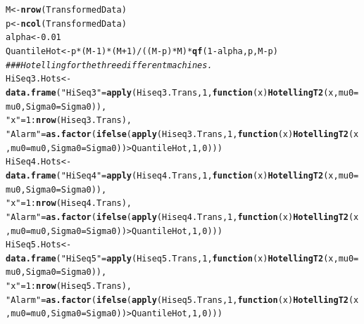 \documentclass[a4paper,11pt,fleqn,twoside,notitlepage]{report}
\makeatletter
\newcommand{\hlnum}[1]{\textcolor[rgb]{0.686,0.059,0.569}{#1}}%
\newcommand{\hlstr}[1]{\textcolor[rgb]{0.192,0.494,0.8}{#1}}%
\newcommand{\hlcom}[1]{\textcolor[rgb]{0.678,0.584,0.686}{\textit{#1}}}%
\newcommand{\hlopt}[1]{\textcolor[rgb]{0,0,0}{#1}}%
\newcommand{\hlstd}[1]{\textcolor[rgb]{0.345,0.345,0.345}{#1}}%
\newcommand{\hlkwa}[1]{\textcolor[rgb]{0.161,0.373,0.58}{\textbf{#1}}}%
\newcommand{\hlkwb}[1]{\textcolor[rgb]{0.69,0.353,0.396}{#1}}%
\newcommand{\hlkwc}[1]{\textcolor[rgb]{0.333,0.667,0.333}{#1}}%
\newcommand{\hlkwd}[1]{\textcolor[rgb]{0.737,0.353,0.396}{\textbf{#1}}}%
\newenvironment{kframe}{%
 \def\at@end@of@kframe{}%
 \ifinner\ifhmode%
  \def\at@end@of@kframe{\end{minipage}}%
  \begin{minipage}{\columnwidth}%
 \fi\fi%
 \def\FrameCommand##1{\hskip\@totalleftmargin \hskip-\fboxsep
 \colorbox{shadecolor}{##1}\hskip-\fboxsep
     \hskip-\linewidth \hskip-\@totalleftmargin \hskip\columnwidth}%
 \MakeFramed {\advance\hsize-\width
   \@totalleftmargin\z@ \linewidth\hsize
   \@setminipage}}%
 {\par\unskip\endMakeFramed%
 \at@end@of@kframe}
\newenvironment{knitrout}{}{} %
\makeatother
\begin{document}
\begin{knitrout}
\color{fgcolor}\begin{kframe}
\begin{alltt}
\hlstd{M} \hlkwb{<-} \hlkwd{nrow}\hlstd{(TransformedData)}
\hlstd{p} \hlkwb{<-} \hlkwd{ncol}\hlstd{(TransformedData)}
\hlstd{alpha} \hlkwb{<-} \hlnum{0.01}
\hlstd{QuantileHot} \hlkwb{<-} \hlstd{p}\hlopt{*}\hlstd{(M}\hlopt{-}\hlnum{1}\hlstd{)}\hlopt{*}\hlstd{(M}\hlopt{+}\hlnum{1}\hlstd{)}\hlopt{/}\hlstd{((M}\hlopt{-}\hlstd{p)}\hlopt{*}\hlstd{M)} \hlopt{*} \hlkwd{qf}\hlstd{(}\hlnum{1}\hlopt{-}\hlstd{alpha, p, M}\hlopt{-}\hlstd{p)}
\hlcom{### Hotelling for the three different machines.}
\hlstd{HiSeq3.Hots} \hlkwb{<-} \hlkwd{data.frame}\hlstd{(}\hlstr{"HiSeq3"}\hlstd{=}\hlkwd{apply}\hlstd{(Hiseq3.Trans,} \hlnum{1}\hlstd{,} \hlkwa{function}\hlstd{(}\hlkwc{x}\hlstd{)} \hlkwd{HotellingT2}\hlstd{(x,}\hlkwc{mu0}\hlstd{=mu0,}\hlkwc{Sigma0}\hlstd{=Sigma0)),}
                          \hlstr{"x"}\hlstd{=}\hlnum{1}\hlopt{:}\hlkwd{nrow}\hlstd{(Hiseq3.Trans),}
                          \hlstr{"Alarm"}\hlstd{=}\hlkwd{as.factor}\hlstd{(}\hlkwd{ifelse}\hlstd{(}\hlkwd{apply}\hlstd{(Hiseq3.Trans,} \hlnum{1}\hlstd{,} \hlkwa{function}\hlstd{(}\hlkwc{x}\hlstd{)} \hlkwd{HotellingT2}\hlstd{(x,}\hlkwc{mu0}\hlstd{=mu0,}\hlkwc{Sigma0}\hlstd{=Sigma0))}\hlopt{>}\hlstd{QuantileHot,}\hlnum{1}\hlstd{,}\hlnum{0}\hlstd{)))}
\hlstd{HiSeq4.Hots} \hlkwb{<-} \hlkwd{data.frame}\hlstd{(}\hlstr{"HiSeq4"}\hlstd{=}\hlkwd{apply}\hlstd{(Hiseq4.Trans,} \hlnum{1}\hlstd{,} \hlkwa{function}\hlstd{(}\hlkwc{x}\hlstd{)} \hlkwd{HotellingT2}\hlstd{(x,}\hlkwc{mu0}\hlstd{=mu0,}\hlkwc{Sigma0}\hlstd{=Sigma0)),}
                          \hlstr{"x"}\hlstd{=}\hlnum{1}\hlopt{:}\hlkwd{nrow}\hlstd{(Hiseq4.Trans),}
                          \hlstr{"Alarm"}\hlstd{=}\hlkwd{as.factor}\hlstd{(}\hlkwd{ifelse}\hlstd{(}\hlkwd{apply}\hlstd{(Hiseq4.Trans,} \hlnum{1}\hlstd{,} \hlkwa{function}\hlstd{(}\hlkwc{x}\hlstd{)} \hlkwd{HotellingT2}\hlstd{(x,}\hlkwc{mu0}\hlstd{=mu0,}\hlkwc{Sigma0}\hlstd{=Sigma0))}\hlopt{>}\hlstd{QuantileHot,}\hlnum{1}\hlstd{,}\hlnum{0}\hlstd{)))}
\hlstd{HiSeq5.Hots} \hlkwb{<-} \hlkwd{data.frame}\hlstd{(}\hlstr{"HiSeq5"}\hlstd{=}\hlkwd{apply}\hlstd{(Hiseq5.Trans,} \hlnum{1}\hlstd{,} \hlkwa{function}\hlstd{(}\hlkwc{x}\hlstd{)} \hlkwd{HotellingT2}\hlstd{(x,}\hlkwc{mu0}\hlstd{=mu0,}\hlkwc{Sigma0}\hlstd{=Sigma0)),}
                          \hlstr{"x"}\hlstd{=}\hlnum{1}\hlopt{:}\hlkwd{nrow}\hlstd{(Hiseq5.Trans),}
                          \hlstr{"Alarm"}\hlstd{=}\hlkwd{as.factor}\hlstd{(}\hlkwd{ifelse}\hlstd{(}\hlkwd{apply}\hlstd{(Hiseq5.Trans,} \hlnum{1}\hlstd{,} \hlkwa{function}\hlstd{(}\hlkwc{x}\hlstd{)} \hlkwd{HotellingT2}\hlstd{(x,}\hlkwc{mu0}\hlstd{=mu0,}\hlkwc{Sigma0}\hlstd{=Sigma0))}\hlopt{>}\hlstd{QuantileHot,}\hlnum{1}\hlstd{,}\hlnum{0}\hlstd{)))}
\end{alltt}
\end{kframe}
\end{knitrout}
\end{document}
